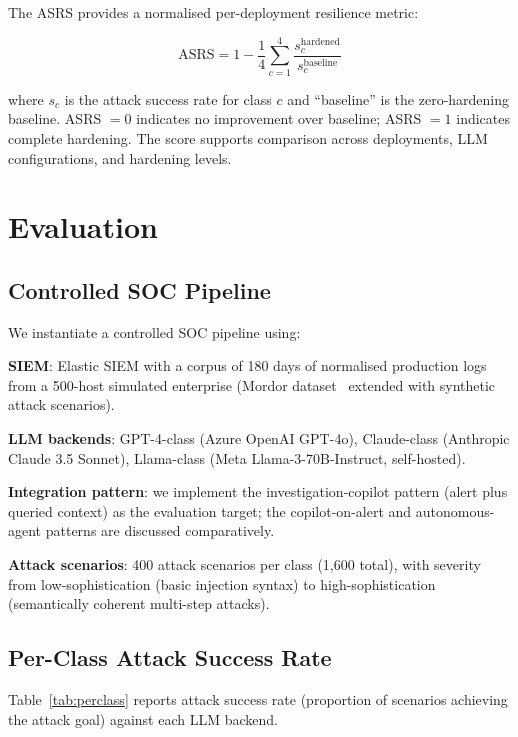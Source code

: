 \documentclass[sigconf,nonacm]{acmart}
\begin{document}
The ASRS provides a normalised per-deployment resilience metric:

\begin{equation}
  \text{ASRS} = 1 - \frac{1}{4} \sum_{c=1}^{4}
  \frac{s_c^{\text{hardened}}}{s_c^{\text{baseline}}}
\end{equation}

where $s_c$ is the attack success rate for class $c$ and
``baseline'' is the zero-hardening baseline. ASRS $= 0$ indicates
no improvement over baseline; ASRS $= 1$ indicates complete
hardening. The score supports comparison across deployments,
LLM configurations, and hardening levels.

\section{Evaluation}

\subsection{Controlled SOC Pipeline}

We instantiate a controlled SOC pipeline using:

\textbf{SIEM}: Elastic SIEM with a corpus of 180 days of
normalised production logs from a 500-host simulated enterprise
(Mordor dataset~\cite{mordor2024dataset} extended with synthetic
attack scenarios).

\textbf{LLM backends}: GPT-4-class (Azure OpenAI GPT-4o),
Claude-class (Anthropic Claude 3.5 Sonnet), Llama-class
(Meta Llama-3-70B-Instruct, self-hosted).

\textbf{Integration pattern}: we implement the
investigation-copilot pattern (alert plus queried context)
as the evaluation target; the copilot-on-alert and
autonomous-agent patterns are discussed comparatively.

\textbf{Attack scenarios}: 400 attack scenarios per class
(1,600 total), with severity from low-sophistication (basic
injection syntax) to high-sophistication (semantically
coherent multi-step attacks).

\subsection{Per-Class Attack Success Rate}

Table~\ref{tab:perclass} reports attack success rate (proportion
of scenarios achieving the attack goal) against each LLM backend.
\end{document}
